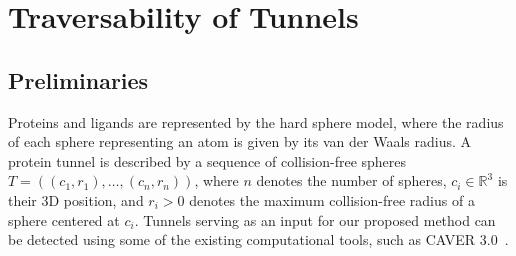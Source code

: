 \documentclass[usletter, 10pt, conference]{ieeeconf} %
\def\R{\mathbb{R}}
\begin{document}






\section{Traversability of Tunnels}

\subsection{Preliminaries}

Proteins and ligands are represented by the hard sphere model, where the radius of each sphere representing an atom is given by its van der Waals radius.
A protein tunnel is described by a sequence of collision-free spheres 
$T=( (c_1, r_1),\ldots,(c_n,r_n) )$, where $n$ denotes the number of spheres,
$c_i \in \R^3$ is their 3D position, and $r_i > 0$ denotes the maximum collision-free radius of a sphere centered at $c_i$. 
Tunnels serving as an input for our proposed method can be detected using some of the existing computational tools, such as CAVER 3.0~\cite{caver3}.
\end{document}
